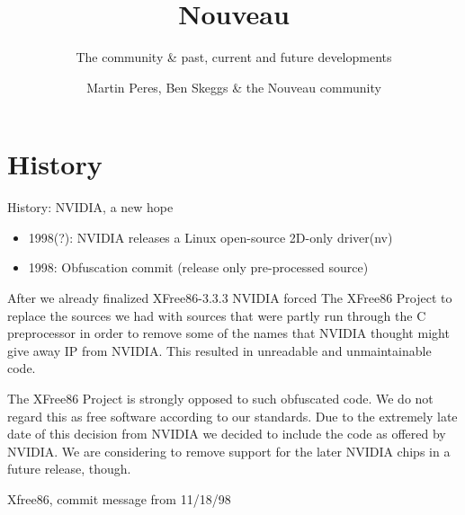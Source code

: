 \documentclass[11pt,english,compress]{beamer}
\title{Nouveau}
\subtitle{The community \& past, current and future developments}
\author{Martin Peres, Ben Skeggs \& the Nouveau community}
\institute{Ph.D. student at LaBRI, Red Hat}
\begin{document}

\begin{frame}
	\titlepage
\end{frame}

\section{History}
	\begin{frame}
		\begin{block}{History: NVIDIA, a new hope}
			\begin{itemize}
				\item 1998(?): NVIDIA releases a Linux open-source 2D-only driver(nv)
				\item 1998: Obfuscation commit (release only pre-processed source)
			\end{itemize}
		\end{block}
	\end{frame}

	\begin{frame}
		\begin{block}{}
			After we already finalized XFree86-3.3.3 NVIDIA forced The XFree86 Project
			to replace the sources we had with sources that were partly run through the
			C preprocessor in order to remove some of the names that NVIDIA thought
			might give away IP from NVIDIA. This resulted in unreadable and unmaintainable
			code.
		\end{block}

		\begin{block}{}
			The XFree86 Project is strongly opposed to such obfuscated code. We do not
			regard this as free software according to our standards. Due to the extremely
			late date of this decision from NVIDIA we decided to include the code as
			offered by NVIDIA. We are considering to remove support for the later NVIDIA
			chips in a future release, though.
		\end{block}

		 Xfree86, commit message from 11/18/98
	\end{frame}
\end{document}
